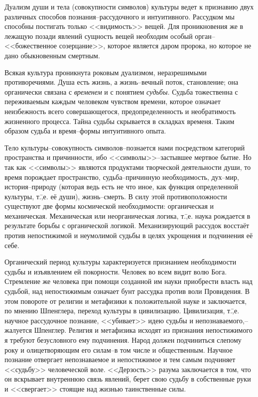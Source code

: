 Дуализм души и тела (совокупности символов) культуры ведет к признавию двух различных способов познания\---рассудочного и интуитивного. Рассудком мы способны постигать только <<видимость>> вещей. Для проникновения же в лежащую позади явлений сущность вещей необходим особый орган\---<<божественное созерцание>>, которое является даром пророка, но которое не дано обыкновенным смертным.

Всякая культура проникнута роковым дуализмом, неразрешимыми противоречиями. Душа есть жизнь, а жизнь\---вечный поток, становление; она органически связана с \emph{временем} и с понятием \emph{судьбы.} Судьба тожественна с переживаемым каждым человеком чувством времени, которое означает неизбежность всего совершающегося, предопределенность и необратимость жизненного процесса. Тайна судьбы скрывается в складках временя. Таким образом судьба и время\---формы интуитивного опыта.

Тело культуры\---совокупность символов\---познается нами посредством категорий пространства и причинности, ибо <<символы>>\---застывшее мертвое бытие. Но так как <<символы>> являются продуктами творческой деятельности души, то время порождает пространство, судьба\---причинную необходимость, дух\---мир, история\---природу (которая ведь есть не что иное, как функция определенной культуры, т.\=,е. её души), жизнь\---смерть. В силу этой противоположности существуют две формы космической необходимости: органическая и механическая. Механическая или неорганическая логика, т.\=,е. наука рождается в результате борьбы с органической логикой. Механизирующий рассудок восстаёт против непостижимой и неумолимой судьбы в целях укрощения и подчинения её себе.

Органический период культуры характеризуется признанием необходимости судьбы и изъявлением ей покорности. Человек во всем видит волю Бога. Стремление же человека при помощи созданной им науки приобрести власть над судьбой, над непостижимым означает бунт рассудка против воли Провидения. В этом повороте от религии и метафизики к положительной науке и заключается, по мнению Шпенглера, переход культуры в цивилизацию. Цивилизация, т.\=,е. научное рассудочное познание, <<убивает>> идею судьбы и непознаваемого,\---жалуется Шпенглер. Религия и метафизика исходят из признания непостижимого я требуют безусловного ему подчинения. Народ должен подчиниться слепому року и олицетворяющим его силам\---в том числе и общественным. Научное познание отвергает непознаваемое и непостижимое и тем самым подчиняет <<судьбу>> человеческой воле. <<Дерзость>> разума заключается в том, что он вскрывает внутреннюю связь явлений, берет свою судьбу в собственные руки и <<свергает>> стоящие над жизнью таинственные силы.

